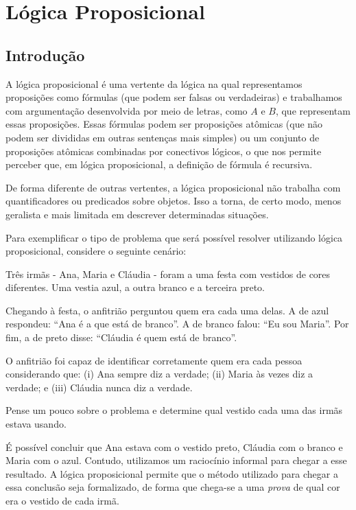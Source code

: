 \chapter{Lógica Proposicional}
\section{Introdução}

A lógica proposicional é uma vertente da lógica na qual representamos proposições como fórmulas (que podem ser falsas ou verdadeiras) e trabalhamos com argumentação desenvolvida por meio de letras, como $A$ e $B$, que representam essas proposições. Essas fórmulas podem ser proposições atômicas (que não podem ser divididas em outras sentenças mais simples) ou um conjunto de proposições atômicas combinadas por conectivos lógicos, o que nos permite perceber que, em lógica proposicional, a definição de fórmula é recursiva.

De forma diferente de outras vertentes, a lógica proposicional não trabalha com quantificadores ou predicados sobre objetos. Isso a torna, de certo modo, menos geralista e mais limitada em descrever determinadas situações.

Para exemplificar o tipo de problema que será possível resolver utilizando lógica proposicional, considere o seguinte cenário:

\bigbreak
Três irmãs - Ana, Maria e Cláudia - foram a uma festa com vestidos de cores diferentes. Uma vestia azul, a outra branco e a terceira
preto. 

Chegando à festa, o anfitrião perguntou quem era cada uma
delas. A de azul respondeu: ``Ana é a que está de branco”. A de branco falou: ``Eu sou Maria”. Por fim, a de preto disse:  ``Cláudia é quem está de branco”.

O anfitrião foi capaz de identificar corretamente quem era cada pessoa considerando que: (i) Ana sempre diz a verdade; (ii) Maria às vezes diz a verdade; e (iii) Cláudia nunca diz a verdade.

Pense um pouco sobre o problema e determine qual vestido cada uma das irmãs estava usando. 
\bigbreak

É possível concluir que Ana estava com o vestido preto, Cláudia com o branco e Maria com o azul. Contudo, utilizamos um raciocínio informal para chegar a esse resultado. A lógica proposicional permite que o método utilizado para chegar a essa conclusão seja formalizado, de forma que chega-se a uma  \textit{prova} de qual cor era o vestido de cada irmã. 

